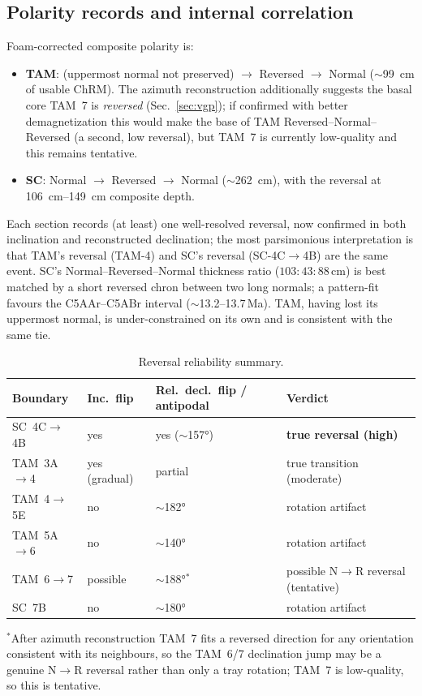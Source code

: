 \documentclass[11pt]{article}
\begin{document}
\subsection{Polarity records and internal correlation}
Foam-corrected composite polarity is:
\begin{itemize}
  \item \textbf{TAM}: (uppermost normal not preserved) $\to$ Reversed $\to$
        Normal ($\sim$\SI{99}{\centi\meter} of usable ChRM). The azimuth
        reconstruction additionally suggests the basal core TAM~7 is
        \emph{reversed} (Sec.~\ref{sec:vgp}); if confirmed with better
        demagnetization this would make the base of TAM Reversed--Normal--Reversed
        (a second, low reversal), but TAM~7 is currently low-quality and this
        remains tentative.
  \item \textbf{SC}: Normal $\to$ Reversed $\to$ Normal
        ($\sim$\SI{262}{\centi\meter}), with the reversal at
        \SIrange{106}{149}{\centi\meter} composite depth.
\end{itemize}
Each section records (at least) one well-resolved reversal, now confirmed in
both inclination and reconstructed declination; the most parsimonious
interpretation is that TAM's reversal (TAM-4) and SC's reversal (SC-4C$\to$4B)
are the same event. SC's Normal--Reversed--Normal thickness ratio
($103\!:\!43\!:\!88$\,cm) is best matched by a short reversed chron between two
long normals; a pattern-fit favours the C5AAr--C5ABr interval
($\sim$13.2--13.7\,Ma). TAM, having lost its uppermost
normal, is under-constrained on its own and is consistent with the same tie.

\begin{table}[h]\centering
\caption{Reversal reliability summary.}
\begin{tabular}{@{}llll@{}}
\toprule
Boundary & Inc.\ flip & Rel.\ decl.\ flip / antipodal & Verdict \\ \midrule
SC~4C$\to$4B & yes & yes ($\sim$\ang{157}) & \textbf{true reversal (high)} \\
TAM~3A$\to$4 & yes (gradual) & partial & true transition (moderate) \\
TAM~4$\to$5E & no & $\sim$\ang{182} & rotation artifact \\
TAM~5A$\to$6 & no & $\sim$\ang{140} & rotation artifact \\
TAM~6$\to$7 & possible & $\sim$\ang{188}$^{*}$ & possible N$\to$R reversal (tentative) \\
SC~7B & no & $\sim$\ang{180} & rotation artifact \\ \bottomrule
\end{tabular}

\medskip
{\footnotesize $^{*}$After azimuth reconstruction TAM~7 fits a reversed
direction for any orientation consistent with its neighbours, so the TAM~6/7
declination jump may be a genuine N$\to$R reversal rather than only a tray
rotation; TAM~7 is low-quality, so this is tentative.}
\end{table}
\end{document}
